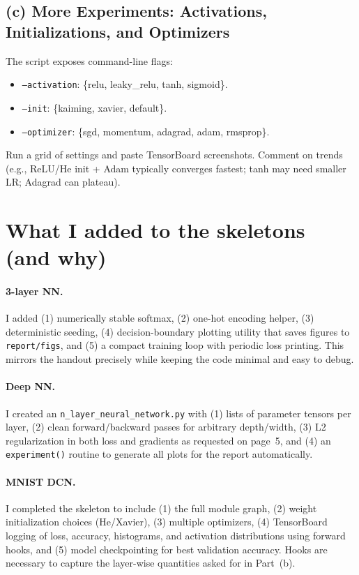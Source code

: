 \documentclass[11pt]{article}
\begin{document}
\subsection{(c) More Experiments: Activations, Initializations, and Optimizers}
The script exposes command-line flags:
\begin{itemize}[leftmargin=1.2em]
  \item \texttt{--activation}: \{relu, leaky\_relu, tanh, sigmoid\}.
  \item \texttt{--init}: \{kaiming, xavier, default\}.
  \item \texttt{--optimizer}: \{sgd, momentum, adagrad, adam, rmsprop\}.
\end{itemize}
Run a grid of settings and paste TensorBoard screenshots. Comment on trends (e.g., ReLU/He init + Adam typically converges fastest; tanh may need smaller LR; Adagrad can plateau).

\section{What I added to the skeletons (and why)}
\paragraph{3-layer NN.} I added (1) numerically stable softmax, (2) one-hot encoding helper, (3) deterministic seeding, (4) decision-boundary plotting utility that saves figures to \texttt{report/figs}, and (5) a compact training loop with periodic loss printing. This mirrors the handout precisely while keeping the code minimal and easy to debug.

\paragraph{Deep NN.} I created an \texttt{n\_layer\_neural\_network.py} with (1) lists of parameter tensors per layer, (2) clean forward/backward passes for arbitrary depth/width, (3) L2 regularization in both loss and gradients as requested on page~5, and (4) an \texttt{experiment()} routine to generate all plots for the report automatically.

\paragraph{MNIST DCN.} I completed the skeleton to include (1) the full module graph, (2) weight initialization choices (He/Xavier), (3) multiple optimizers, (4) TensorBoard logging of loss, accuracy, histograms, and activation distributions using forward hooks, and (5) model checkpointing for best validation accuracy. Hooks are necessary to capture the layer-wise quantities asked for in Part~(b).
\end{document}
